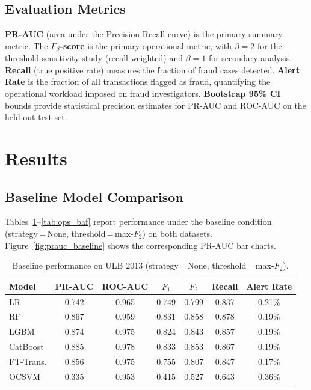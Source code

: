 \documentclass[a4paper,fleqn]{cas-sc}
\begin{document}
\subsection{Evaluation Metrics}
\label{subsec:metrics}

\textbf{PR-AUC} (area under the Precision-Recall curve) is the primary summary metric.
The \textbf{$F_\beta$-score} is the primary operational metric, with $\beta\!=\!2$ for
the threshold sensitivity study (recall-weighted) and $\beta\!=\!1$ for secondary analysis.
\textbf{Recall} (true positive rate) measures the fraction of fraud cases detected.
\textbf{Alert Rate} is the fraction of all transactions flagged as fraud, quantifying
the operational workload imposed on fraud investigators.
\textbf{Bootstrap 95\% CI} bounds provide statistical precision estimates for PR-AUC
and ROC-AUC on the held-out test set.

\section{Results}
\label{sec:results}

\subsection{Baseline Model Comparison}
\label{subsec:baseline}

Tables~\ref{tab:baseline_ulb}--\ref{tab:ops_baf} report performance under the baseline
condition (strategy\,=\,None, threshold\,=\,max-$F_2$) on both datasets.
Figure~\ref{fig:prauc_baseline} shows the corresponding PR-AUC bar charts.

\begin{table}[ht!]
\centering
\caption{Baseline performance on ULB 2013 (strategy\,=\,None, threshold\,=\,max-$F_2$).}
\label{tab:baseline_ulb}
\begin{tabular}{l c c c c c c}
\toprule
Model & PR-AUC & ROC-AUC & $F_1$ & $F_2$ & Recall & Alert Rate \\
\midrule
LR         & 0.742 & 0.965 & 0.749 & 0.799 & 0.837 & 0.21\% \\
RF         & 0.867 & 0.959 & 0.831 & 0.858 & 0.878 & 0.19\% \\
LGBM       & 0.874 & 0.975 & 0.824 & 0.843 & 0.857 & 0.19\% \\
CatBoost   & 0.885 & 0.978 & 0.833 & 0.853 & 0.867 & 0.19\% \\
FT-Trans.  & 0.856 & 0.975 & 0.755 & 0.807 & 0.847 & 0.17\% \\
OCSVM      & 0.335 & 0.953 & 0.415 & 0.527 & 0.643 & 0.36\% \\
\bottomrule
\end{tabular}
\end{table}
\end{document}
